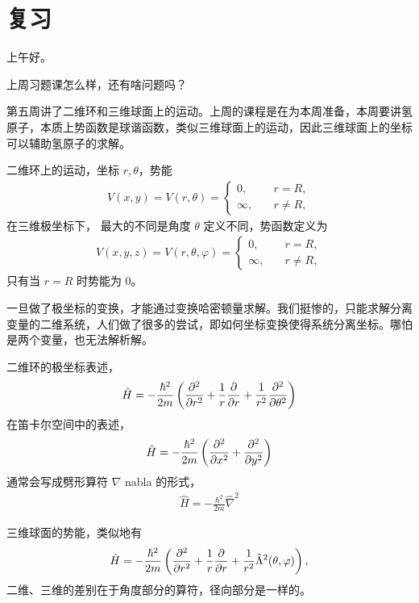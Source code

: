 

\section{复习}
上午好。

上周习题课怎么样，还有啥问题吗？

第五周讲了二维环和三维球面上的运动。上周的课程是在为本周准备，本周要讲氢原子，本质上势函数是球谐函数，类似三维球面上的运动，因此三维球面上的坐标可以辅助氢原子的求解。

二维环上的运动，坐标 $r,\theta$，势能
\begin{align}
    V(x,y) = V(r,\theta) = \begin{cases}
        0, \quad &r=R,\\
        \infty, \quad &r\neq R,
    \end{cases}
\end{align}
在三维极坐标下，
最大的不同是角度 $\theta$ 定义不同，势函数定义为
\begin{align}
    V(x,y,z) = V(r,\theta,\varphi) = \begin{cases}
        0,\quad &r=R,\\
        \infty, \quad &r\neq R,
    \end{cases}
\end{align}
只有当 $r=R$ 时势能为 0。

一旦做了极坐标的变换，才能通过变换哈密顿量求解。我们挺惨的，只能求解分离变量的二维系统，人们做了很多的尝试，即如何坐标变换使得系统分离坐标。哪怕是两个变量，也无法解析解。

二维环的极坐标表述，
\begin{align}
    \hat H = - \frac{\hbar^2}{2m} \left(
        \pdv[2]{r} + \frac1r \pdv{r} + \frac1{r^2} \pdv[2]{\theta}
    \right)
\end{align}
在笛卡尔空间中的表述，
\begin{align}
    \hat H = -\frac{\hbar^2}{2m} \left(
        \pdv[2]{x} + \pdv[2]{y}
    \right)
\end{align}
通常会写成劈形算符 $\nabla$ nabla 的形式，
\begin{align}
    \hat H = -\frac{\hbar^2}{2m} \hat \nabla^2
\end{align}

三维球面的势能，类似地有
\begin{align}
    \hat H = - \frac{\hbar^2}{2m} \left(
        \pdv[2]{r} + \frac1r \pdv{r} + \frac1{r^2} \hat\Lambda^2(\theta,\varphi)
    \right), 
\end{align}
二维、三维的差别在于角度部分的算符，径向部分是一样的。

